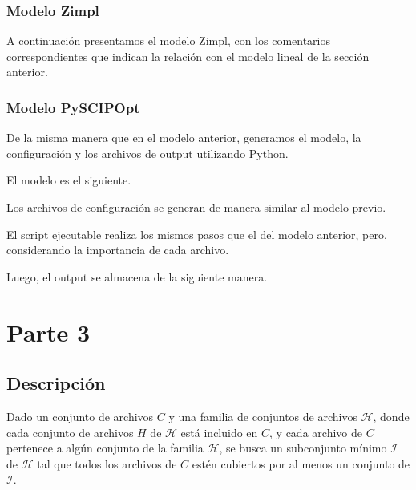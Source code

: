 \documentclass[11pt, a4paper, pdftex]{article}
\begin{document}
\newpage
\subsubsection{Modelo Zimpl}

A continuación presentamos el modelo Zimpl, con los comentarios correspondientes que indican la relación con el modelo lineal de la sección anterior.



\newpage
\subsubsection{Modelo PySCIPOpt}

De la misma manera que en el modelo anterior, generamos el modelo, la configuración y los 
archivos de output utilizando Python.

El modelo es el siguiente.



Los archivos de configuración se generan de manera similar al modelo previo.



\newpage

El script ejecutable realiza los mismos pasos que el del modelo anterior, pero, considerando 
la importancia de cada archivo.



\newpage

Luego, el output se almacena de la siguiente manera.



\newpage
\section{Parte 3}

\subsection{Descripción}

Dado un conjunto de archivos $C$ y una familia de conjuntos de archivos
$\mathcal{H}$, donde cada conjunto de archivos $H$ de $\mathcal{H}$ está
incluido en $C$, y cada archivo de $C$ pertenece a algún conjunto de la familia
$\mathcal{H}$, se busca un subconjunto mínimo $\mathcal{I}$ de $\mathcal{H}$
tal que todos los archivos de $C$ estén cubiertos por al menos un conjunto de
$\mathcal{I}$.
\end{document}
